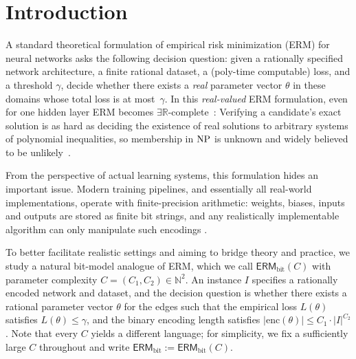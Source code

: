 \documentclass{article}
\theoremstyle{plain}
\theoremstyle{definition}
\theoremstyle{remark}
\begin{document}
\section{Introduction}

A standard theoretical formulation of empirical risk minimization (ERM) for neural
networks asks the following decision question: given a rationally specified
network architecture, a finite rational dataset, a (poly-time computable) loss, and a threshold $\gamma$,
decide whether there exists a \emph{real} parameter vector $\theta$ in these
domains whose total loss is at most~$\gamma$. In this \emph{real-valued} ERM
formulation, even for one hidden layer ERM becomes
$\exists\mathbb{R}$-complete~\cite{BertschingerHJM23,NEURIPS2021_9813b270,hankala2024complexity}:
Verifying a candidate's exact solution is as hard as deciding the existence of real
solutions to arbitrary systems of polynomial inequalities, so membership in
$\textnormal{NP}$ is unknown and widely believed to be unlikely~\cite{schaefer2024existential}.


From the perspective of actual learning systems, this formulation hides an
important issue. Modern training pipelines, and essentially all real-world
implementations, operate with finite-precision arithmetic: weights, biases,
inputs and outputs are stored as finite bit strings, and any realistically
implementable algorithm can only manipulate such encodings
\cite{goldberg1991every,higham2002accuracy}. 


To better facilitate realistic settings and aiming to bridge theory and practice, we study a natural bit-model
analogue of ERM, which we call $\mathsf{ERM}_{\text{bit}}(C)$ with parameter complexity
$C=(C_1,C_2)\in\mathbb{N}^2$. An instance $I$ specifies a rationally encoded network and dataset, and the decision question is whether there exists a rational parameter vector $\theta$ for the edges such that the empirical loss $L(\theta)$ satisfies
$L(\theta)\le \gamma$, and the binary encoding length satisfies
$|\mathrm{enc}(\theta)| \le C_1\cdot |I|^{C_2}$. 
Note that every $C$ yields a different language; for simplicity, we fix a sufficiently large $C$ throughout and write
$\mathsf{ERM}_{\text{bit}}:=\mathsf{ERM}_{\text{bit}}(C)$.


\end{document}

